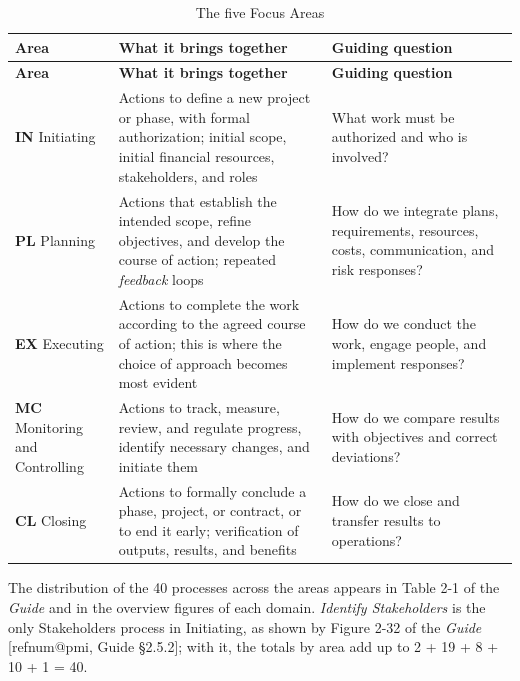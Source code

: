 \documentclass[11pt,a4paper]{article}
\makeatletter
\newcommand{\refnum}[1]{\csname refnum@#1\endcsname}
\newcommand{\cit}[1]{[\refnum{#1}]}
\newcommand{\SingleSpacing}{}
\newcommand{\fontetab}[1]{\par\vspace{3pt}{\small\noindent Source: #1\par}}
\makeatother
\begin{document}
\begingroup\SingleSpacing\small
\begin{longtable}{@{}>{\raggedright\arraybackslash}p{}>{\raggedright\arraybackslash}p{}>{\raggedright\arraybackslash}p{}@{}}
\caption{The five Focus Areas}\label{tab:t6}\\
\toprule
\textbf{Area} & \textbf{What it brings together} & \textbf{Guiding question}\\
\midrule
\endfirsthead
\toprule
\textbf{Area} & \textbf{What it brings together} & \textbf{Guiding question}\\
\midrule
\endhead
\bottomrule
\endfoot
\bottomrule
\endlastfoot
\textbf{IN} Initiating & Actions to define a new project or phase, with formal authorization; initial scope, initial financial resources, stakeholders, and roles & What work must be authorized and who is involved?\\[3pt]
\textbf{PL} Planning & Actions that establish the intended scope, refine objectives, and develop the course of action; repeated \textit{feedback} loops & How do we integrate plans, requirements, resources, costs, communication, and risk responses?\\[3pt]
\textbf{EX} Executing & Actions to complete the work according to the agreed course of action; this is where the choice of approach becomes most evident & How do we conduct the work, engage people, and implement responses?\\[3pt]
\textbf{MC} Monitoring and Controlling & Actions to track, measure, review, and regulate progress, identify necessary changes, and initiate them & How do we compare results with objectives and correct deviations?\\[3pt]
\textbf{CL} Closing & Actions to formally conclude a phase, project, or contract, or to end it early; verification of outputs, results, and benefits & How do we close and transfer results to operations?\\[3pt]
\end{longtable}
\endgroup
\fontetab{Prepared by the authors (2026), based on \cit{pmi}.}

The distribution of the 40 processes across the areas appears in Table 2-1 of the \textit{Guide} and in the overview figures of each domain. \textit{Identify Stakeholders} is the only Stakeholders process in Initiating, as shown by Figure 2-32 of the \textit{Guide} [\refnum{pmi}, Guide §2.5.2]; with it, the totals by area add up to 2 + 19 + 8 + 10 + 1 = 40.
\end{document}
